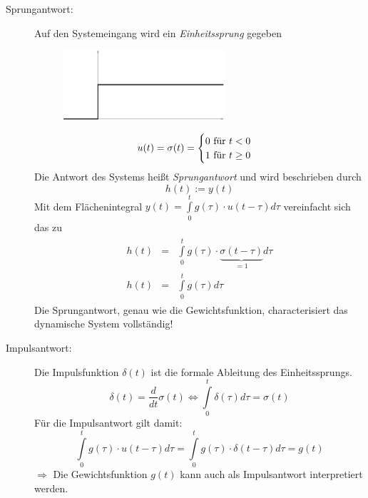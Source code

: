 \documentclass[12pt,a4paper,ngerman]{scrartcl}
\begin{document}
\begin{description}
\item[Sprungantwort:] Auf den Systemeingang wird ein \emph{Einheitssprung} gegeben

  \begin{figure}[H]
    \centering
    \includegraphics[width=6cm]{sysregel_einheitssprung}
  \end{figure}
  \begin{equation*}
    u(t)=\sigma (t) =\begin{cases} 0 $ für $t<0\\1 $ für $ t \geq 0\end{cases}
  \end{equation*}
Die Antwort des Systems heißt \emph{Sprungantwort} und wird beschrieben durch
\begin{equation*}
  h(t):=y(t)
\end{equation*}
Mit dem Flächenintegral $y(t)=\int\limits_0^t{g(\tau)\cdot u(t-\tau)d\tau}$ vereinfacht sich das zu
\begin{align*}
  \begin{array}{lll}
    h(t)&=&\int\limits_0^t{g(\tau)\cdot \underbrace{\sigma (t-\tau)}_{=1}d\tau}\\
    h(t)&=&\int\limits_0^t{g(\tau)d\tau}  
  \end{array}
\end{align*}
Die Sprungantwort, genau wie die Gewichtsfunktion, characterisiert das dynamische System vollständig!
\item[Impulsantwort: ] Die Impulsfunktion $\delta (t)$ ist die formale Ableitung des Einheitssprungs.
  \begin{equation*}
    \delta (t)=\frac{d}{dt}\sigma (t) \Leftrightarrow \int\limits_0^t{\delta(\tau)d\tau =\sigma(t)}
  \end{equation*}
Für die Impulsantwort gilt damit:
\begin{equation*}
  \int\limits_0^t{g(\tau)\cdot u(t-\tau)d\tau} =\int\limits_0^t{g(\tau)\cdot \delta(t-\tau)d\tau }=g(t)
\end{equation*}
$\Rightarrow$ Die Gewichtsfunktion $g(t)$ kann auch als Impulsantwort interpretiert werden.

\end{description}
\end{document}
